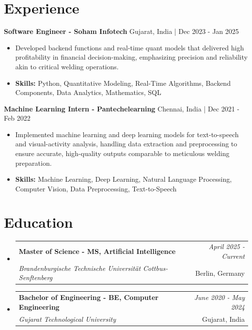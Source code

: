 \documentclass[a4paper,11pt]{article}
\makeatletter
\newcommand{\resumeSubheading}[4]{
\vspace{0.5mm}\item
    \begin{tabular*}{\linewidth}[t]{l@{\extracolsep{\fill}}r}
        \textbf{#1} & \textit{\footnotesize{#4}} \\
        \textit{\footnotesize{#3}} &  \footnotesize{#2}\\
    \end{tabular*}
    \vspace{-2.4mm}
}
\makeatother
\begin{document}
\section{\textbf{Experience}}


\vspace{1mm}
  \textbf{Software Engineer - Soham Infotech} \hfill Gujarat, India | Dec 2023 - Jan 2025
\vspace{-1.5mm} %
\begin{itemize}
  \item Developed backend functions and real-time quant models that delivered high profitability in financial decision-making, emphasizing precision and reliability akin to critical welding operations.

\vspace{-2mm}
  \item \textbf{Skills:} Python, Quantitative Modeling, Real-Time Algorithms, Backend Components, Data Analytics, Mathematics, SQL
\end{itemize}

\vspace{1mm}
  \textbf{Machine Learning Intern - Pantechelearning} \hfill Chennai, India | Dec 2021 - Feb 2022
\vspace{-1.5mm} %
\begin{itemize}
  \item Implemented machine learning and deep learning models for text-to-speech and visual-activity analysis, handling data extraction and preprocessing to ensure accurate, high-quality outputs comparable to meticulous welding preparation.
\vspace{-2mm}
  \item \textbf{Skills:} Machine Learning, Deep Learning, Natural Language Processing, Computer Vision, Data Preprocessing, Text-to-Speech
\end{itemize}\section{\textbf{Education}}
\vspace{-0.4mm}

\begin{itemize}[leftmargin=0.15in, label={}]
\resumeSubheading
{Master of Science - MS, Artificial Intelligence }{Berlin, Germany}
{Brandenburgische Technische Universität Cottbus-Senftenberg  }{April 2025 - Current}

\vspace{1.0mm} %
\resumeSubheading
{Bachelor of Engineering - BE, Computer Engineering  }{Gujarat, India}
{Gujarat Technological University }{June 2020 - May 2024}

\end{itemize}
\end{document}
